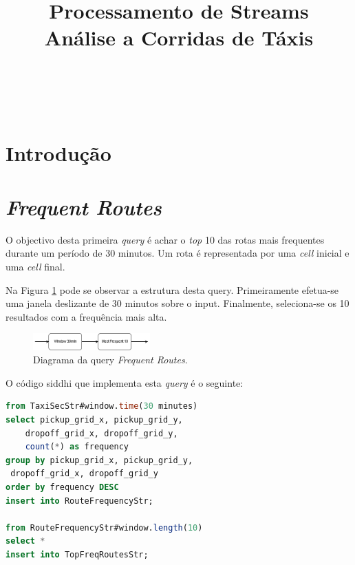 \documentclass[article]{IEEEtran}
\begin{document}
\title{Processamento de Streams\\Análise a Corridas de Táxis}


\author{\\
\and
{}\\
}

\maketitle



\section{Introdução}

\section{\textit{Frequent Routes}}

O objectivo desta primeira \textit{query} é achar o \textit{top} 10 das rotas mais frequentes durante um período de 30 minutos. Um rota é representada por uma \textit{cell} inicial e uma \textit{cell} final.

Na Figura \ref{fig:frequentRoutesDiagram} pode se observar a estrutura desta query. Primeiramente efetua-se uma janela deslizante de 30 minutos sobre o input. Finalmente, seleciona-se os 10 resultados com a frequência mais alta.

\begin{figure}[hbtp]
    \centering
        \includegraphics[width=0.4\textwidth]{images/frequentRoutesDiagram}
    \caption{Diagrama da query \textit{Frequent Routes}.}
    \label{fig:frequentRoutesDiagram}
\end{figure}

O código siddhi que implementa esta \textit{query} é o seguinte:

\begin{lstlisting}[language=SQL]
from TaxiSecStr#window.time(30 minutes)
select pickup_grid_x, pickup_grid_y, 
	dropoff_grid_x, dropoff_grid_y,
	count(*) as frequency
group by pickup_grid_x, pickup_grid_y,
 dropoff_grid_x, dropoff_grid_y
order by frequency DESC
insert into RouteFrequencyStr;

from RouteFrequencyStr#window.length(10)
select *
insert into TopFreqRoutesStr;
\end{lstlisting}
\end{document}

